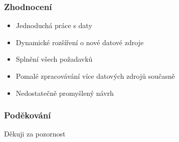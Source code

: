 \documentclass{beamer}
\begin{document}
	\begin{frame}
		\frametitle{Zhodnocení}
		
		\begin{itemize}
			\item Jednoduchá práce s daty
			\item Dynamické rozšíření o nové datové zdroje
			\item Splnění všech požadavků
			\item Pomalé zpracovávání více datových zdrojů současně
			\item Nedostatečně promyšlený návrh
		\end{itemize}
	\end{frame}

	\begin{frame}
		\frametitle{Poděkování}
		
		\begin{center}
			\Huge
			Děkuji za pozornost
		\end{center}
		
	\end{frame}
	
\end{document}
